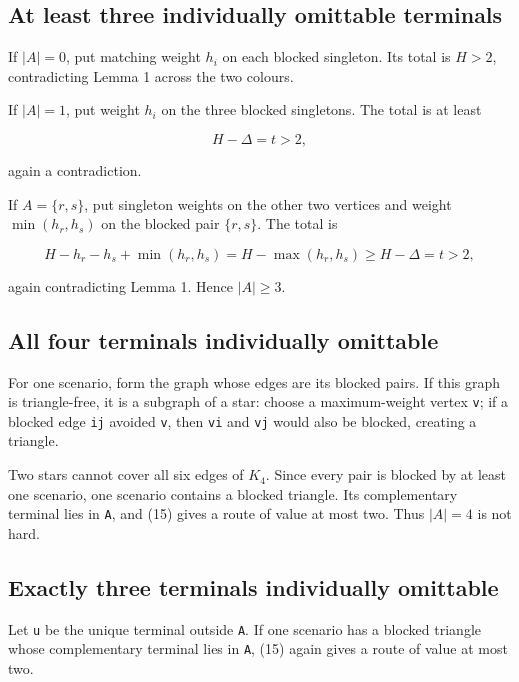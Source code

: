 \documentclass[
  11pt,
]{article}
\begin{document}
\subsection{At least three individually omittable
terminals}\label{at-least-three-individually-omittable-terminals}

If \(|A|=0\), put matching weight \(h_i\) on each blocked singleton. Its
total is \(H>2\), contradicting Lemma 1 across the two colours.

If \(|A|=1\), put weight \(h_i\) on the three blocked singletons. The
total is at least

\[
H-\Delta=t>2,
\]

again a contradiction.

If \(A=\{r,s\}\), put singleton weights on the other two vertices and
weight \(\min(h_r,h_s)\) on the blocked pair \(\{r,s\}\). The total is

\[
H-h_r-h_s+\min(h_r,h_s)
=H-\max(h_r,h_s)
\ge H-\Delta=t>2,
\]

again contradicting Lemma 1. Hence \(|A|\ge3\).

\subsection{All four terminals individually
omittable}\label{all-four-terminals-individually-omittable}

For one scenario, form the graph whose edges are its blocked pairs. If
this graph is triangle-free, it is a subgraph of a star: choose a
maximum-weight vertex \texttt{v}; if a blocked edge \texttt{ij} avoided
\texttt{v}, then \texttt{vi} and \texttt{vj} would also be blocked,
creating a triangle.

Two stars cannot cover all six edges of \(K_4\). Since every pair is
blocked by at least one scenario, one scenario contains a blocked
triangle. Its complementary terminal lies in \texttt{A}, and (15) gives
a route of value at most two. Thus \(|A|=4\) is not hard.

\subsection{Exactly three terminals individually
omittable}\label{exactly-three-terminals-individually-omittable}

Let \texttt{u} be the unique terminal outside \texttt{A}. If one
scenario has a blocked triangle whose complementary terminal lies in
\texttt{A}, (15) again gives a route of value at most two.
\end{document}
